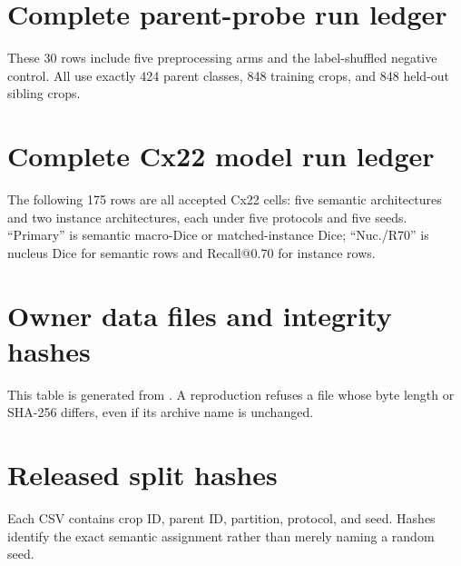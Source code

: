 \documentclass[11pt,oneside]{report}
\newcommand{\artifact}[1]{\path{#1}}
\begin{document}
\chapter{Complete parent-probe run ledger}

These 30 rows include five preprocessing arms and the label-shuffled negative control. All use exactly 424 parent classes, 848 training crops, and 848 held-out sibling crops.

\begin{landscape}
\footnotesize
\setlength{\tabcolsep}{3pt}

\end{landscape}

\chapter{Complete Cx22 model run ledger}

The following 175 rows are all accepted Cx22 cells: five semantic architectures and two instance architectures, each under five protocols and five seeds. ``Primary'' is semantic macro-Dice or matched-instance Dice; ``Nuc./R70'' is nucleus Dice for semantic rows and Recall@0.70 for instance rows.

\begin{landscape}
\scriptsize
\setlength{\tabcolsep}{2.2pt}

\end{landscape}

\chapter{Owner data files and integrity hashes}

This table is generated from \artifact{data_sources.json}. A reproduction refuses a file whose byte length or SHA-256 differs, even if its archive name is unchanged.

\begin{landscape}
\scriptsize
\setlength{\tabcolsep}{3pt}

\end{landscape}

\chapter{Released split hashes}

Each CSV contains crop ID, parent ID, partition, protocol, and seed. Hashes identify the exact semantic assignment rather than merely naming a random seed.
\end{document}
